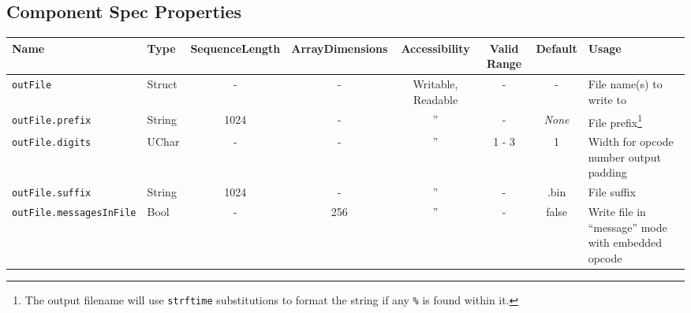 \documentclass{article}
\begin{document}
\begin{landscape}
  \section*{Component Spec Properties}
  \begin{minipage}{\textwidth}
    \renewcommand*\footnoterule{} %
    \renewcommand{\thempfootnote}{\arabic{mpfootnote}} %
  \begin{scriptsize}
    \begin{tabular}{|p{3cm}|p{1.5cm}|c|c|c|c|c|p{7cm}|}
      \hline
      \rowcolor{blue}
      Name                          & Type      & SequenceLength & ArrayDimensions & Accessibility      & Valid Range & Default       & Usage \\
      \hline
				\verb+outFile+                & Struct    & -              & -               & Writable, Readable & -           & -             & File name(s) to write to                                                                                                                                                                      \\
      \hline
				\verb+outFile.prefix+         & String    & 1024           & -               & ''                  & -           & \textit{None} & File prefix\footnote{\label{strftime}The output filename will use \texttt{strftime} substitutions to format the string if any \texttt{\%} is found within it.}                                \\
      \hline
				\verb+outFile.digits+         & UChar     & -              & -               & ''                  & 1 - 3       & 1             & Width for opcode number output padding                                                                                                                                                        \\
      \hline
				\verb+outFile.suffix+         & String    & 1024           & -               & ''                  & -           & .bin          & File suffix\footnotemark[\getrefnumber{strftime}]                                                                                                                                             \\
      \hline
				\verb+outFile.messagesInFile+ & Bool      & -              & 256             & ''                  & -           & false         & Write file in ``message'' mode with embedded opcode                                                                                                                                           \\

\end{tabular}
\end{scriptsize}
\end{minipage}
\end{landscape}
\end{document}
